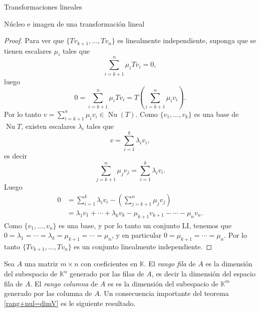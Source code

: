 \documentclass[a4paper,12pt,twoside,spanish,reqno]{amsbook}
\theoremstyle{definition}
\theoremstyle{remark}
\newcommand{\nuc}{\operatorname{Nu}}
\newcommand{\K}{\mathbb K}
\begin{document}
\begin{chapter}{Transformaciones lineales}
\begin{section}{Núcleo e imagen de una transformación lineal}
\begin{proof}
             Para ver que  $\{Tv_{k+1},\ldots,Tv_n \}$ es linealmente independiente, suponga que se tienen escalares $\mu_i$ tales que
             $$
             \sum_{i=k+1}^n \mu_i Tv_i = 0,
             $$
             luego
             $$
             0 = \sum_{i=k+1}^n \mu_i Tv_i =   T(\sum_{i=k+1}^n\mu_iv_i).  
             $$
             Por lo tanto $v =\sum_{i=k+1}^n \mu_iv_i\in \nuc(T)$. Como  $\{v_1,\ldots,v_k \}$ es una base de $\nuc T$,  existen escalares $\lambda_i$ tales que
             $$
             v =  \sum_{i=1}^k \lambda_i v_i,
             $$
             es decir
             $$
             \sum_{j=k+1}^n \mu_jv_j =  \sum_{i=1}^k \lambda_i v_i.
             $$
             Luego
             \begin{align*}
                     0 &= \sum_{i=1}^k \lambda_i v_i - (\sum_{j=k+1}^n \mu_jv_j) \\
                     &= \lambda_1 v_1 + \cdots +\lambda_k v_k - \mu_{k+1}v_{k+1} -\cdots-\mu_nv_n.
             \end{align*}
             Como $\{v_1,\ldots,v_n \}$ es una base, y por lo tanto un conjunto LI,  tenemos que  $0=\lambda_1=\cdots=\lambda_k=\mu_{k+1}=\cdots=\mu_n$, y  en particular $0=\mu_{k+1}=\cdots=\mu_n$. Por lo tanto $\{Tv_{k+1},\ldots,Tv_n \}$ es un conjunto linealmente independiente.		  
        \end{proof}
        
    
        
        Sea $A$ una matriz $m \times n$ con coeficientes  en $\K$. El  \textit{rango fila} de $A$ es la dimensión del subespacio de $\K^n$ generado por las filas de $A$, es decir la dimensión del espacio fila de $A$. El \textit{rango columna} de $A$  es es la dimensión del subespacio de $\K^m$ generado por las columna de $A$. Un  consecuencia importante del teorema \ref{rang+nul=dimV} es le siguiente resultado. 
        

\end{section}
\end{chapter}
\end{document}
